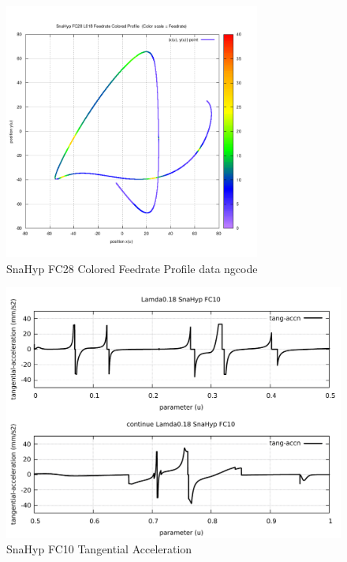 \begin{figure}
	\caption     {SnaHyp FC28 Colored Feedrate Profile data ngcode}
	\label{20-img-SnaHyp-FC28-Colored-Feedrate-Profile-data_ngcode.png}
\includegraphics[width=0.75\textwidth]{Chap4/appendix/app-SnaHyp/plots/20-img-SnaHyp-FC28-Colored-Feedrate-Profile-data_ngcode.png}
\end{figure}

\clearpage
\pagebreak

\begin{figure}
	\caption     {SnaHyp FC10 Tangential Acceleration}
	\label{21-img-SnaHyp-FC10-Tangential-Acceleration.pdf}
\includegraphics[width=1.00\textwidth]{Chap4/appendix/app-SnaHyp/plots/21-img-SnaHyp-FC10-Tangential-Acceleration.pdf}
\end{figure}


